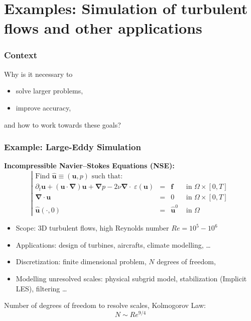 \section{Examples: Simulation of turbulent flows and other applications}

\begin{frame}
  \frametitle{Context}

Why is it necessary to
\begin{itemize}
\item solve larger problems,
\item improve accuracy,
\end{itemize}
and how to work towards these goals?

\end{frame}

\begin{frame}
  \frametitle{Example: Large-Eddy Simulation}

\newcommand{\uu}{{\boldsymbol u}}
\newcommand{\ff}{{\boldsymbol f}}
\newcommand{\Div}{{\boldsymbol\nabla\cdot}}
\newcommand{\Grad}{{\boldsymbol\nabla}}

\textbf{Incompressible Navier--Stokes Equations (NSE):}\\
\begin{equation*}\label{icnseq}
      \left\lvert
      \begin{array}{rcll}
      \mbox{Find $\hat \uu\equiv (\uu, p)$ such that:}\\[2ex]
	    \partial_t  \uu+(\uu\cdot\Grad)\uu+ \Grad p - 2\nu \Div\;\varepsilon(\uu) &=& \ff 
      
      \,\, &\mbox{in } \Omega\times[0,T]\\ 
      \Div \uu&=& 0\,\, &\mbox{in }\Omega\times[0,T]\\
       \hat \uu(\cdot ,0) &=&  \hat \uu^0\,\, &\mbox{in }  \Omega
      \end{array}
      \right.
\end{equation*}

\begin{itemize}
\item Scope: 3D turbulent flows, high Reynolds number $Re = 10^5-10^6$
\item Applications: design of turbines, aircrafts, climate modelling, \dots
\item Discretization: finite dimensional problem, $N$ degrees of freedom,
\item Modelling unresolved scales: physical subgrid model, stabilization (Implicit LES), filtering \dots
\end{itemize}

Number of degrees of freedom to resolve scales, Kolmogorov Law:
\begin{equation*}
N \sim Re^{9/4}
\end{equation*}

\end{frame}

